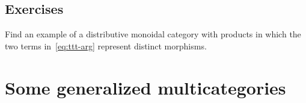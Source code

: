 \documentclass{book}
\begin{document}
\subsection*{Exercises}

\begin{ex}\label{ex:moncat-prod-coprod-context}
  Find an example of a distributive monoidal category with products in which the two terms in~\eqref{eq:ttt-arg} represent distinct morphisms.
\end{ex}


\section{Some generalized multicategories}
\label{sec:cartmulti}

\end{document}

